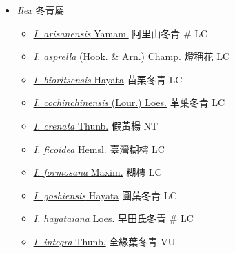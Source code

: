 
  \begin{itemize}
 \item[] \textit{Ilex} 冬青屬
                                
  \begin{itemize}
        \item[] \href{http://www.theplantlist.org/tpl1.1/search?q=Ilex+arisanensis}{\textit{I. arisanensis} Yamam.}   阿里山冬青  \# LC
        \item[] \href{http://www.theplantlist.org/tpl1.1/search?q=Ilex+asprella}{\textit{I. asprella} (Hook. \& Arn.) Champ.}   燈稱花   LC
        \item[] \href{http://www.theplantlist.org/tpl1.1/search?q=Ilex+bioritsensis}{\textit{I. bioritsensis} Hayata}   苗栗冬青   LC
        \item[] \href{http://www.theplantlist.org/tpl1.1/search?q=Ilex+cochinchinensis}{\textit{I. cochinchinensis} (Lour.) Loes.}   革葉冬青   LC
        \item[] \href{http://www.theplantlist.org/tpl1.1/search?q=Ilex+crenata}{\textit{I. crenata} Thunb.}   假黃楊   NT
        \item[] \href{http://www.theplantlist.org/tpl1.1/search?q=Ilex+ficoidea}{\textit{I. ficoidea} Hemsl.}   臺灣糊樗   LC
        \item[] \href{http://www.theplantlist.org/tpl1.1/search?q=Ilex+formosana}{\textit{I. formosana} Maxim.}   糊樗   LC
        \item[] \href{http://www.theplantlist.org/tpl1.1/search?q=Ilex+goshiensis}{\textit{I. goshiensis} Hayata}   圓葉冬青   LC
        \item[] \href{http://www.theplantlist.org/tpl1.1/search?q=Ilex+hayataiana}{\textit{I. hayataiana} Loes.}   早田氏冬青  \# LC
        \item[] \href{http://www.theplantlist.org/tpl1.1/search?q=Ilex+integra}{\textit{I. integra} Thunb.}   全緣葉冬青   VU

\end{itemize}
\end{itemize}
